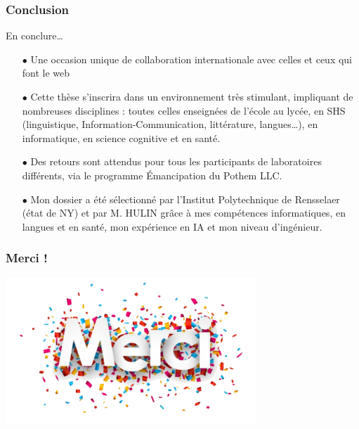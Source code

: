 \documentclass[xcolor=dvipsnames]{beamer}
\begin{document}
\begin{frame}[fragile]
	\frametitle{Conclusion}
	\begin{block}{En conclure…}
		\small{
	\begin{itemize}
		\item[$\bullet$]Une occasion unique de collaboration internationale avec celles et ceux qui font le web
		\item[$\bullet$]Cette thèse s'inscrira dans un environnement très stimulant, impliquant de nombreuses disciplines : toutes celles enseignées de l'école au lycée, en SHS (linguistique, Information-Communication, littérature, langues…), en informatique, en science cognitive et en santé.
		\item[$\bullet$]Des retours sont attendus pour tous les participants de laboratoires différents, via le programme Émancipation du Pothem LLC.
		\item[$\bullet$]Mon dossier a été sélectionné par l'Institut Polytechnique de Rensselaer (état de NY) et par M. HULIN grâce à mes compétences informatiques, en langues et en santé, mon expérience en IA et mon niveau d'ingénieur.
	\end{itemize}}
\end{block}
\end{frame}

\begin{frame}[fragile]
\frametitle{Merci !}
\centering
\includegraphics[height = 5.5cm]{images/merci.png}
\end{frame}
\end{document}
